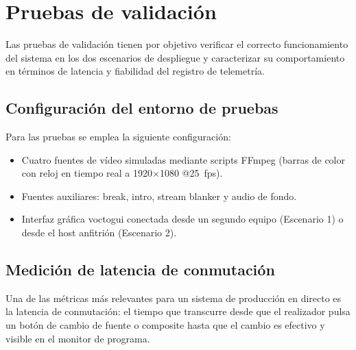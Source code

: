 \section{Pruebas de validación}

Las pruebas de validación tienen por objetivo verificar el correcto funcionamiento del
sistema en los dos escenarios de despliegue y caracterizar su comportamiento en términos
de latencia y fiabilidad del registro de telemetría.

\subsection{Configuración del entorno de pruebas}

Para las pruebas se emplea la siguiente configuración:
\begin{itemize}
  \item Cuatro fuentes de vídeo simuladas mediante scripts FFmpeg (barras de color con
        reloj en tiempo real a 1920×1080 @25~fps).
  \item Fuentes auxiliares: break, intro, stream blanker y audio de fondo.
  \item Interfaz gráfica voctogui conectada desde un segundo equipo (Escenario 1) o
        desde el host anfitrión (Escenario 2).
\end{itemize}


\subsection{Medición de latencia de conmutación}

Una de las métricas más relevantes para un sistema de producción en directo es la
latencia de conmutación: el tiempo que transcurre desde que el realizador pulsa un
botón de cambio de fuente o composite hasta que el cambio es efectivo y visible en el
monitor de programa.

